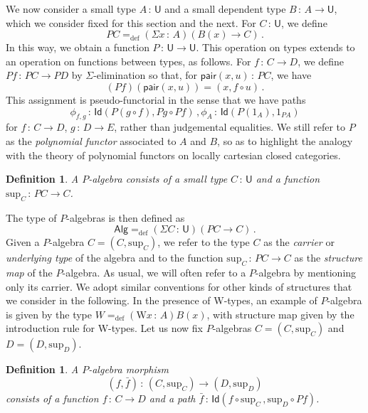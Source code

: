 \documentclass[10pt,a4paper,oneside,reqno]{amsart}
\numberwithin{equation}{section}
\theoremstyle{mythm}
\theoremstyle{mydef}
\newtheorem{definition}[theorem]{Definition}
\theoremstyle{myrmk}
\newcommand{\defeq}{=_{\mathrm{def}}}
\newcommand{\co}{\,{:}\,}
\newcommand{\Id}{\mathsf{Id}}
\newcommand{\pair}{\mathsf{pair}}
\newcommand{\W}{\mathrm{W}}
\newcommand{\U}{\mathsf{U}}
\newcommand{\Palg}{\mathsf{Alg}}
\renewcommand{\sup}{\mathrm{sup}}
\begin{document}
We now consider a small type $A \co \U$ and a small dependent type $B \co A \to \U$, which we consider
fixed for this section and the next. For $C \co \U$,
we define
\[
PC \defeq (\Sigma x \co A) (B(x) \to C) \, .
\]
In this way, we obtain a function $P \co \U \to \U$. This operation on types extends to an operation on functions between 
 types, as follows. For $f \co C \to D$, we define $P f  \co PC \to PD$ by $\Sigma$-elimination
so that, for $\pair(x, u) \co PC$, we have 
\[
(Pf )( \pair(x, u)) = (x,f\circ u) \, .
\] 
This assignment is pseudo-functorial in the sense that we have paths
\begin{equation}
\label{equ:pseudofunP}
\phi_{f, g} \co \Id( P(g \circ f), Pg \circ Pf) \, , \phi_A \co \Id( P(1_A), 1_{PA})
\end{equation}
for $f \co C \to D$, $g \co D \to E$, rather than judgemental equalities. We still refer to $P$ as the \emph{polynomial functor} associated to $A$ and $B$, so as to highlight the analogy with the theory of polynomial functors on locally cartesian closed categories.

\begin{definition} A \emph{$P$-algebra} consists of a small type $C \co \U$ and a function $\sup_C \co PC \to C$. 
\end{definition}

\smallskip

 The type of $P$-algebras is then defined as 
 \[
 \Palg  \defeq (\Sigma C \co \U) (PC \to C) \, .
 \]
 Given a $P$-algebra $C = (C, \sup_C)$,
 we refer to the type $C$ as the \emph{carrier} or \emph{underlying type} of the algebra and to the function $\sup_C \co PC\to C$ as the \emph{structure map} of the $P$-algebra. 
 As usual,  we will often refer to a 
 $P$-algebra by mentioning only its carrier. We adopt similar conventions for other kinds of structures that we consider
 in the following.  In the
 presence of W-types, an example of $P$-algebra is given by the type $W \defeq (\W x\co A)B(x)$, with structure map given by the introduction rule for W-types. 
Let us now fix $P$-algebras $C = (C, \sup_C)$ and $D = (D, \sup_D)$. 

\begin{definition} A \emph{$P$-algebra morphism}
\[
(f, \bar{f}) \co (C, \sup_C) \rightarrow (D, \sup_D)
\]
consists of a function $f \co C \rightarrow D$ and a path $\bar{f} \co \Id( f \circ \sup_C \, , \sup_{D} \circ P f)$.
\end{definition}
\end{document}
